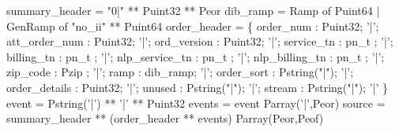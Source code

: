 summary\_header = "0|" ** Puint32 ** Peor
\mbox{}
 dib\_ramp = 
  Ramp of Puint64 
| GenRamp of "no\_ii" ** Puint64
\mbox{}
 order\_header = \{
       order\_num       : Puint32;
 '|';  att\_order\_num  : Puint32;             
 '|';  ord\_version     : Puint32;         
 '|';  service\_tn      : pn\_t ;
 '|';  billing\_tn      : pn\_t ;          
 '|';  nlp\_service\_tn : pn\_t ;
 '|';  nlp\_billing\_tn : pn\_t ;
 '|';  zip\_code        : Pzip ;
 '|';  ramp             : dib\_ramp; 
 '|';  order\_sort      : Pstring("|");
 '|';  order\_details   : Puint32;             
 '|';  unused           : Pstring("|");
 '|';  stream           : Pstring("|");
 '|'
\}
\mbox{}
 event  = Pstring('|') **  '|' ** Puint32
\mbox{}
 events = event Parray('|',Peor)
\mbox{}
 source = summary\_header ** (order\_header ** events) Parray(Peor,Peof)
